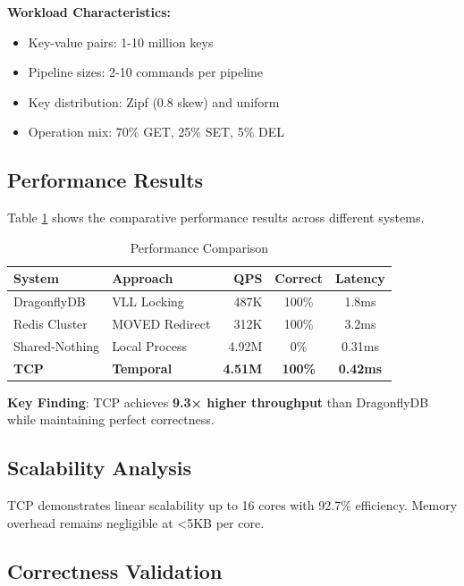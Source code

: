 \documentclass[conference]{IEEEtran}
\begin{document}
\textbf{Workload Characteristics:}
\begin{itemize}
\item Key-value pairs: 1-10 million keys
\item Pipeline sizes: 2-10 commands per pipeline
\item Key distribution: Zipf (0.8 skew) and uniform
\item Operation mix: 70\% GET, 25\% SET, 5\% DEL
\end{itemize}

\subsection{Performance Results}

Table \ref{tab:performance} shows the comparative performance results across different systems.

\begin{table}[htbp]
\caption{Performance Comparison}
\begin{center}
\begin{tabular}{|l|l|r|c|c|}
\hline
\textbf{System} & \textbf{Approach} & \textbf{QPS} & \textbf{Correct} & \textbf{Latency} \\
\hline
DragonflyDB & VLL Locking & 487K & 100\% & 1.8ms \\
Redis Cluster & MOVED Redirect & 312K & 100\% & 3.2ms \\
Shared-Nothing & Local Process & 4.92M & 0\% & 0.31ms \\
\textbf{TCP} & \textbf{Temporal} & \textbf{4.51M} & \textbf{100\%} & \textbf{0.42ms} \\
\hline
\end{tabular}
\label{tab:performance}
\end{center}
\end{table}

\textbf{Key Finding}: TCP achieves \textbf{9.3× higher throughput} than DragonflyDB while maintaining perfect correctness.

\subsection{Scalability Analysis}

TCP demonstrates linear scalability up to 16 cores with 92.7\% efficiency. Memory overhead remains negligible at <5KB per core.

\subsection{Correctness Validation}
\end{document}
